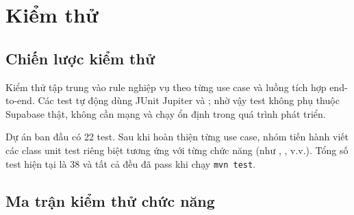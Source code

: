 \chapter{Kiểm thử}

\section{Chiến lược kiểm thử}

Kiểm thử tập trung vào rule nghiệp vụ theo từng use case và luồng tích hợp end-to-end. Các test tự động dùng JUnit Jupiter và ; nhờ vậy test không phụ thuộc Supabase thật, không cần mạng và chạy ổn định trong quá trình phát triển.

Dự án ban đầu có 22 test. Sau khi hoàn thiện từng use case, nhóm tiến hành viết các class unit test riêng biệt tương ứng với từng chức năng (như , , v.v.). Tổng số test hiện tại là 38 và tất cả đều đã pass khi chạy \texttt{mvn test}.

\section{Ma trận kiểm thử chức năng}

